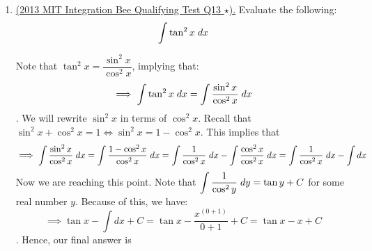 \documentclass[10pt,paper=letter]{scrartcl}
\begin{document}
\begin{enumerate}[resume, label=\arabic*.,font=\bfseries]
\begin{mdframed}[style=jradduemmdbox, frametitle= \textbf{Theorem 3.2.}]
For all positive real numbers $w$, there exists a function $h(w)$ such that $$\int \dfrac{h'(w)}{h(w)} \hspace{1mm} dw = \ln \left(h(w)\right) + C$$ for some constant $C.$
\end{mdframed}

We can say that $h(w) = x^4 + 4$ an $h'(w) = 4x^3$. Therefore, 

 Given from  that by $u$-substitution, $u = x^4 + 4$ and $du = 4x^3 dx$ and for this second solution, you can do the indirect type of such substitution. So, we have: $$\implies \int \dfrac{{4x^3}}{x^4 + 4} \hspace{1mm} dx = \int \dfrac{\cancel{4x^3}}{u} \left(\dfrac{du}{\cancel{4x^3}}\right) = \int \dfrac{1}{u} \hspace{1mm} du = \ln u + C =  \ln(x^4 + 4) + C  $$ Jence, we got a same result. 

\item \textsf{\href{https://math.mit.edu/~sswatson/pdfs/qualifying_round_2013.pdf}{(2013 MIT Integration Bee Qualifying Test Q13 $\star$).}} Evaluate the following: $$\int \tan^2 x \hspace{1mm} dx $$




\sol Note that $\tan^2 x = \dfrac{\sin^2 x}{\cos^2 x}$, implying that: $$\implies \int \tan^2 x \hspace{1mm} dx = \int \dfrac{\sin^2 x}{\cos^2 x} \hspace{1mm} dx $$. We will rewrite $\sin^2 x$ in terms of $\cos^2 x$. Recall that $\sin^2 x + \cos^2 x = 1 \Leftrightarrow \sin^2 x = 1- \cos^2 x.$ This implies that $$\implies \int \dfrac{\sin^2 x}{\cos^2 x} \hspace{1mm} dx = \int \dfrac{1- \cos^2 x}{\cos^2 x} \hspace{1mm} dx = \int  \dfrac{1}{\cos^2 x} \hspace{1mm} dx -  \int  \dfrac{\cos^2 x}{\cos^2 x} \hspace{1mm} dx = \int  \dfrac{1}{\cos^2 x} \hspace{1mm} dx -  \int dx  $$ Now we are reaching this point. Note that $\displaystyle{\int \dfrac{1}{\cos^2 y} \hspace{1mm} dy = \tan y + C}$ for some real number $y.$ Because of this, we have: $$\implies \tan x - \int dx + C = \tan x - \dfrac{x^{(0+1)}}{0+1} +C = \tan x - x + C$$. Hence, our final answer is 
\end{enumerate}
\end{document}
